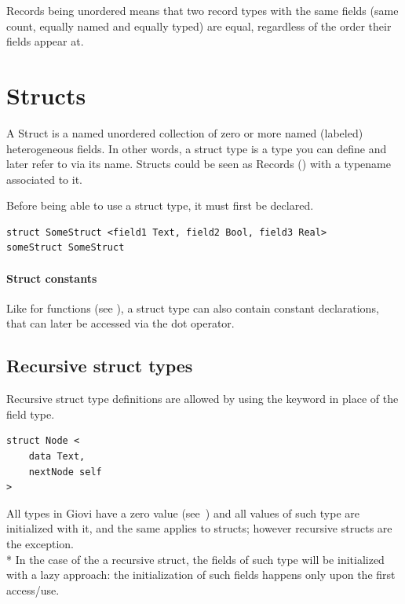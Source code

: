Records being unordered means that two record types with the same fields (same
count, equally named and equally typed) are equal, regardless of the order
their fields appear at.

\section{Structs}
\label{sec:structs}

A Struct is a named unordered collection of zero or more named (labeled)
heterogeneous fields. In other words, a struct type is a type you can define
and later refer to via its name. Structs could be seen as Records
() with a typename associated to it.

Before being able to use a struct type, it must first be declared.

\begin{verbatim}
struct SomeStruct <field1 Text, field2 Bool, field3 Real>
someStruct SomeStruct
\end{verbatim}

\paragraph{Struct constants} Like for functions (see
), a struct type can also contain constant
declarations, that can later be accessed via the dot operator.

\subsection{Recursive struct types}
\label{sec:recursive_structs}

Recursive struct type definitions are allowed by using the  keyword
in place of the field type.


\begin{verbatim}
struct Node <
	data Text,
	nextNode self
>
\end{verbatim}

All types in Giovi have a zero value (see~) and all values
of such type are initialized with it, and the same applies to structs;
however recursive structs are the exception.\\*
In the case of the a recursive struct, the fields of such type will be
initialized with a lazy approach: the initialization of such fields happens
only upon the first access/use.

